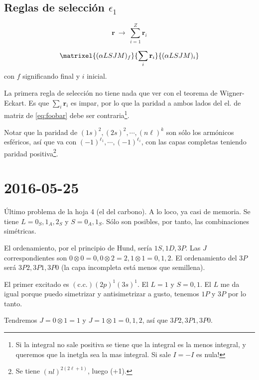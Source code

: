 \subsection{Reglas de selección $\epsilon_1$}

\begin{equation}
  \mathbf{r} \ \rightarrow \ \sum_{i=1}^Z \mathbf{r}_i
\end{equation}

\begin{equation}
  \matrixel{ (\alpha LSJM)_f}{\sum_{i}\mathbf{r}_i}{(\alpha LSJM)_i}
  \label{eq:foobar}
\end{equation}
con $f$ significando final y $i$ inicial. 

La primera regla de selección no tiene nada que ver con el teorema de
Wigner-Eckart. Es que $\sum_{i}\mathbf{r}_i$ es impar, por lo que la
paridad a ambos lados del el. de matriz de \ref{eq:foobar} debe ser
contraria\footnote{Si la integral no sale positiva se tiene que la
  integral es la menos integral, y queremos que la inetgla sea la mas
  integral. Si sale $I=-I$ es nula!}.

Notar que la paridad de $(1s)^2,(2s)^2,\cdots,(n\ell)^k$ son sólo los armónicos esféricos, así que va con
$(-1)^{\ell_1},\cdots,(-1)^{\ell_z}$, con las capas completas teniendo
paridad positiva\footnote{
  Se tiene $(nl)^{2(2\ell+1)}$, luego (+1).
}.

\section{2016-05-25}
Último problema de la hoja 4 (el del carbono).
A lo loco, ya casi de memoria.
Se tiene $L=0_S,1_A,2_S$ y $S=0_A,1_S$. Sólo son posibles, por tanto,
las combinaciones simétricas.

El ordenamiento, por el principio de Hund, sería $1S,1D,3P$.
Las $J$ correspondientes son
$0\otimes0=0,0\otimes2=2,1\otimes1=0,1,2$. El ordenamiento del $3P$
será $3P2,3P1,3P0$ (la capa incompleta está menos que semillena).

El primer excitado es $(\text{c.c.})(2p)^1(3s)^1$. El $L=1$ y $S=0,1$.
El $L$ me da igual porque puedo simetrizar y antisimetrizar a gusto,
tenemos $1P$ y $3P$ por lo tanto.

Tendremos $J=0\otimes1=1$ y $J=1\otimes1=0,1,2$, así que
$3P2,3P1,3P0$.\footnotemark


